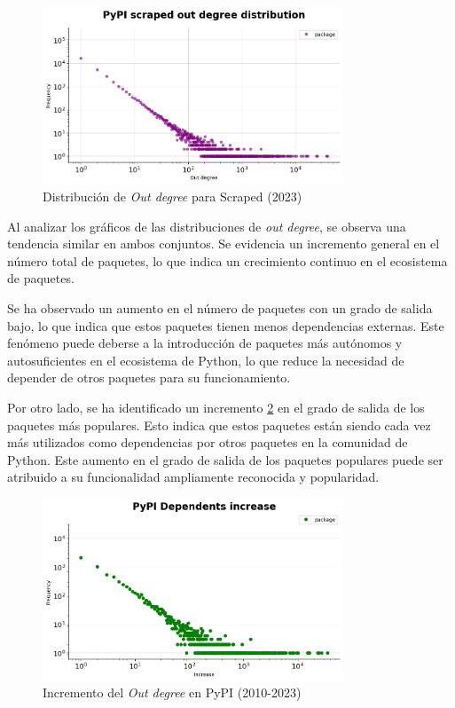 \begin{figure}[ht!]
    \begin{center}
        \includegraphics[width=0.8\textwidth]{img/pypi/outd_scraped_dist.png}
        \caption{Distribución de \textit{Out degree} para Scraped (2023)}
        \label{fig:pypi_scraped_outd_dist}
    \end{center}
\end{figure}

Al analizar los gráficos de las distribuciones de \textit{out degree}, se observa una tendencia similar
en ambos conjuntos. Se evidencia un incremento general en el número total de paquetes, lo que indica un
crecimiento continuo en el ecosistema de paquetes.

Se ha observado un aumento en el número de paquetes con un grado de salida bajo, lo que indica que estos
paquetes tienen menos dependencias externas. Este fenómeno puede deberse a la introducción de paquetes
más autónomos y autosuficientes en el ecosistema de Python, lo que reduce la necesidad de depender de
otros paquetes para su funcionamiento.

Por otro lado, se ha identificado un incremento \ref{fig:dependents_increase} en el grado de salida de los paquetes más populares.
Esto indica que estos paquetes están siendo cada vez más utilizados como dependencias por otros paquetes
en la comunidad de Python. Este aumento en el grado de salida de los paquetes populares puede ser atribuido
a su funcionalidad ampliamente reconocida y popularidad.

\begin{figure}[ht!]
    \begin{center}
        \includegraphics[width=0.8\textwidth]{img/pypi/dependents_increase.png}
        \caption{Incremento del \textit{Out degree} en PyPI (2010-2023)}
        \label{fig:dependents_increase}
    \end{center}
\end{figure}


